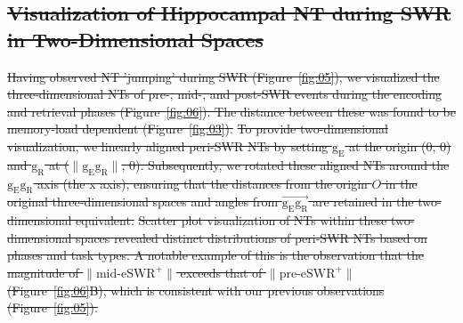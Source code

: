 \documentclass[preprint,review,12pt]{elsarticle}%
\providecommand{\DIFdeltex}[1]{{\protect\color{red}\sout{#1}}}                      %
\providecommand{\DIFdelbegin}{} %
\providecommand{\DIFdelend}{} %
\providecommand{\DIFdel}[1]{\texorpdfstring{\DIFdeltex{#1}}{}} %
\newcommand{\DIFscaledelfig}{0.5}
\newlength{\DIFdelgraphicswidth} %
\newlength{\DIFdelgraphicsheight} %
\newcommand{\DIFdelincludegraphics}[2][]{%
\sbox{\DIFdelgraphicsbox}{\DIFOincludegraphics[#1]{#2}}%
\settoboxwidth{\DIFdelgraphicswidth}{\DIFdelgraphicsbox} %
\settoboxtotalheight{\DIFdelgraphicsheight}{\DIFdelgraphicsbox} %
\scalebox{\DIFscaledelfig}{%
\parbox[b]{\DIFdelgraphicswidth}{\usebox{\DIFdelgraphicsbox}\\[-\baselineskip] \rule{\DIFdelgraphicswidth}{0em}}\llap{\resizebox{\DIFdelgraphicswidth}{\DIFdelgraphicsheight}{%
\setlength{\unitlength}{\DIFdelgraphicswidth}%
\begin{picture}(1,1)%
\thicklines\linethickness{2pt} %
{\color[rgb]{1,0,0}\put(0,0){\framebox(1,1){}}}%
{\color[rgb]{1,0,0}\put(0,0){\line( 1,1){1}}}%
{\color[rgb]{1,0,0}\put(0,1){\line(1,-1){1}}}%
\end{picture}%
}\hspace*{3pt}}} %
} %
\DeclareRobustCommand{\DIFdelbegin}{\DIFOdelbegin \let\includegraphics\DIFdelincludegraphics} %
\DeclareRobustCommand{\DIFdelend}{\DIFOaddend \let\includegraphics\DIFOincludegraphics} %
\begin{document}
\DIFdelbegin \subsection{\DIFdel{Visualization of Hippocampal NT during SWR in Two-Dimensional Spaces}}
\addtocounter{subsection}{-1}%
\DIFdel{Having observed NT 'jumping' during SWR (Figure~\ref{fig:05}), we visualized the three-dimensional NTs of pre-, mid-, and post-SWR events during the encoding and retrieval phases (Figure~\ref{fig:06}). The distance between these was found to be memory-load dependent (Figure~\ref{fig:03}). 
}%
\DIFdel{To provide two-dimensional visualization, we linearly aligned peri-SWR NTs by setting $\mathrm{g_{E}}$ at the origin (0, 0) and $\mathrm{g_{R}}$ at ($\mathrm{\lVert g_{E}g_{R} \rVert}$, 0). Subsequently, we rotated these aligned NTs around the $\mathrm{g_{E}g_{R}}$ axis (the x axis), ensuring that the distances from the origin $O$ in the original three-dimensional spaces and angles from $\overrightarrow{\mathrm{g_{E}g_{R}}}$ are retained in the two-dimensional equivalent.
}%
\DIFdel{Scatter plot visualization of NTs within these two-dimensional spaces revealed distinct distributions of peri-SWR NTs based on phases and task types. A notable example of this is the observation that the magnitude of  $\mathrm{\lVert \text{mid-eSWR}^+ \rVert}$ exceeds that of $\mathrm{\lVert \text{pre-eSWR}^+ \rVert}$ (Figure~\ref{fig:06}B), which is consistent with our previous observations (Figure~\ref{fig:05}).
}\DIFdelend %
\end{document}
